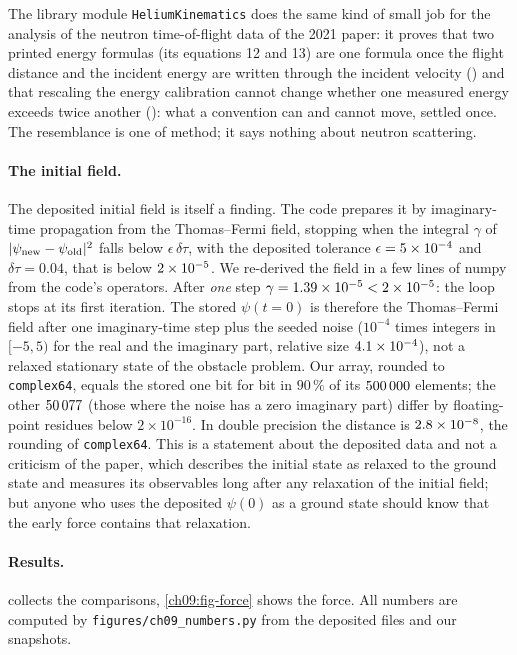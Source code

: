 The library module \texttt{HeliumKinematics} does the same kind of small job for the analysis of the neutron time-of-flight data of the 2021 paper: it proves that two printed energy formulas (its equations 12 and 13) are one formula once the flight distance and the incident energy are written through the incident velocity () and that rescaling the energy calibration cannot change whether one measured energy exceeds twice another (): what a convention can and cannot move, settled once. The resemblance is one of method; it says nothing about neutron scattering.

\paragraph{The initial field.} The deposited initial field is itself a finding. The code prepares it by imaginary-time propagation from the Thomas--Fermi field, stopping when the integral $\gamma$ of $|\psi_{\rm new}-\psi_{\rm old}|^2$ falls below $\epsilon\,\delta\tau$, with the deposited tolerance $\epsilon=5\times10^{-4}$ and $\delta\tau=0.04$, that is below $2\times10^{-5}$. We re-derived the field in a few lines of numpy from the code's operators. After \emph{one} step $\gamma=1.39\times10^{-5}<2\times10^{-5}$: the loop stops at its first iteration. The stored $\psi(t=0)$ is therefore the Thomas--Fermi field after one imaginary-time step plus the seeded noise ($10^{-4}$ times integers in $[-5,5)$ for the real and the imaginary part, relative size $4.1\times10^{-4}$), not a relaxed stationary state of the obstacle problem. Our array, rounded to \texttt{complex64}, equals the stored one bit for bit in $90\,\%$ of its $500\,000$ elements; the other $50\,077$ (those where the noise has a zero imaginary part) differ by floating-point residues below $2\times10^{-16}$. In double precision the distance is $2.8\times10^{-8}$, the rounding of \texttt{complex64}. This is a statement about the deposited data and not a criticism of the paper, which describes the initial state as relaxed to the ground state and measures its observables long after any relaxation of the initial field; but anyone who uses the deposited $\psi(0)$ as a ground state should know that the early force contains that relaxation.

\paragraph{Results.}  collects the comparisons, \cref{ch09:fig-force} shows the force. All numbers are computed by \texttt{figures/ch09\_numbers.py} from the deposited files and our snapshots.

